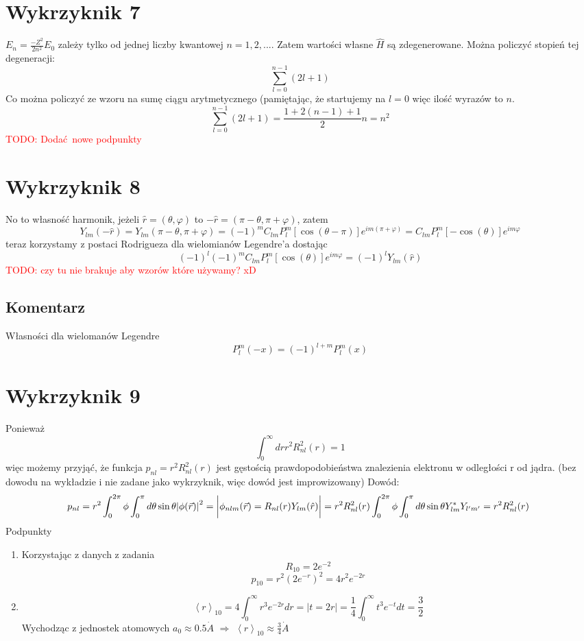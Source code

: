 \documentclass[a4paper,12pt]{article}
\newcommand\myworries[1]{\textcolor{red}{#1}} %
\begin{document}
\section{Wykrzyknik 7}
$E_n = \frac{-Z^2}{2n^2}E_0$ zależy tylko od jednej liczby kwantowej $n=1, 2,
...$. Zatem wartości własne $\hat{H}$ są zdegenerowane.
Można policzyć stopień tej degeneracji:
\[
  \sum^{n-1}_{l=0} (2l+1) 
\]
Co można policzyć ze wzoru na sumę ciągu arytmetycznego (pamiętając, że
startujemy na $l=0$ więc ilość wyrazów to $n$.
\[
  \sum^{n-1}_{l=0} (2l+1) = \frac{1+2(n-1) + 1}{2}n = n^2
\]
\myworries{TODO: Dodać nowe podpunkty}

\section{Wykrzyknik 8}
No to własność harmonik, jeżeli $\hat{r} = (\theta,\varphi)$ to $-\hat{r} = (\pi-\theta,\pi+\varphi)$, zatem
$$
	Y_{lm}(-\hat{r}) = Y_{lm}(\pi-\theta,\pi+\varphi) = (-1)^m C_{lm} P^m_l[\cos(\theta-\pi)]e^{im(\pi+\varphi)} = C_{lm} P^m_l[-\cos(\theta)]e^{im\varphi}
$$
teraz korzystamy z postaci Rodrigueza dla wielomianów Legendre'a dostając
$$
	(-1)^l (-1)^m C_{lm} P^m_l[\cos(\theta)]e^{im\varphi} = (-1)^l Y_{lm}(\hat{r})
$$
\myworries{TODO: czy tu nie brakuje aby wzorów które używamy? xD}

\subsection{Komentarz}
	Własności dla wielomanów Legendre
	$$
		P_l^m (-x) = (-1)^{l+m} P_l^m(x)
	$$
\section{Wykrzyknik 9}
Ponieważ 
\[
  \int_0^\infty dr r^2 R_{nl}^2(r) = 1
\]
więc możemy przyjąć, że funkcja $p_{nl} = r^2R_{nl}^2(r)$ jest gęstością
prawdopodobieństwa znalezienia elektronu w odległości r od jądra. (bez dowodu
na wykładzie i nie zadane jako wykrzyknik, więc dowód jest improwizowany)
Dowód:
\[
  p_{nl} = r^2 \int_0^{2\pi}\phi\int_0^\pi d\theta\sin\theta
  \abs{\phi(\vec{r})}^2 = \bigg\vert \phi_{nlm} (\vec{r}) =
  R_{nl}(r)Y_{lm}(\hat{r}) \bigg\vert =
  r^2R_{nl}^2(r)\int_0^{2\pi}\phi\int_0^\pi d\theta\sin\theta Y^*_{lm} Y_{l'm'}
  = r^2 R_{nl}^2(r)
  \
\]
Podpunkty
\begin{enumerate}[label=(\alph*)]
  \item Korzystając z danych z zadania
    \[
      R_{10} = 2e^{-2}
    \]
    \[
      p_{10} = r^2(2e^{-r})^2 = 4r^2 e^{-2r}
    \]
  \item
    \[
      \left< r \right>_{10} = 4 \int_0^\infty r^3 e^{-2r} dr = \bigg \vert t =
      2r \bigg \vert = \frac{1}{4} \int_0^\infty t^3 e^{-t} dt = \frac{3}{2}
    \]
    Wychodząc z jednostek atomowych $a_0 \approx 0.5 \dot{A}$ $\Rightarrow$
    $\left< r \right>_{10} \approx \frac{3}{4} \dot{A}$
\end{enumerate}
\end{document}
